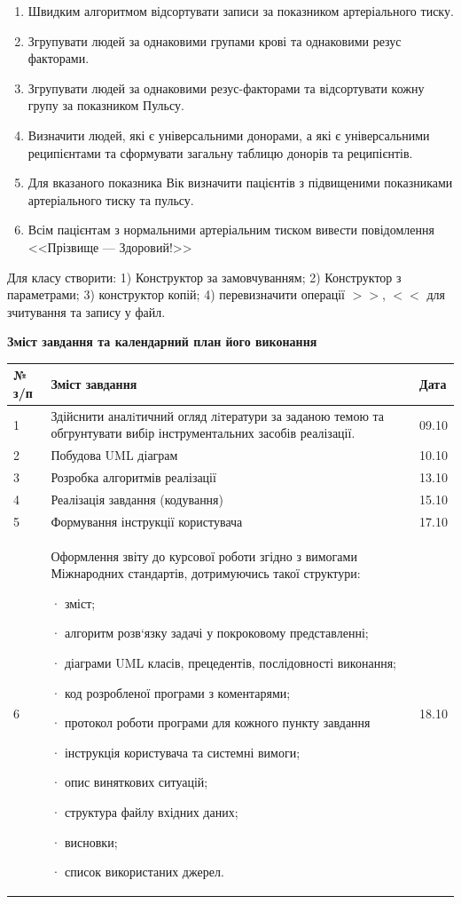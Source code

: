 \documentclass[oneside,14pt]{extarticle}
\begin{document}
\begin{enumerate}
	\item Швидким алгоритмом відсортувати записи за показником артеріального
	тиску.
	\item Згрупувати людей за однаковими групами крові та однаковими резус
	факторами.
	\item Згрупувати людей за однаковими резус-факторами та відсортувати кожну
	групу за показником Пульсу.
	\item Визначити людей, які є універсальними донорами, а які є універсальними
	реципієнтами та сформувати загальну таблицю донорів та реципієнтів.
	\item Для вказаного показника Вік визначити пацієнтів з підвищеними показниками
	артеріального тиску та пульсу.
	\item Всім пацієнтам з нормальними артеріальним тиском вивести повідомлення
	<<Прізвище --- Здоровий!>>
\end{enumerate}
Для класу створити: 1) Конструктор за замовчуванням; 2) Конструктор з
параметрами; 3) конструктор копій; 4) перевизначити операції $>>$, $<<$ для
зчитування та запису у файл.
\newpage
\begin{center}
	\textbf{Зміст завдання та календарний план його виконання}
	
	\begin{tabular}{ | m{0.7cm} | m{14cm}| m{1.1cm} | }
		\hline
		№ з/п & Зміст завдання & Дата \\ 
		\hline
		1 & Здійснити аналiтичний огляд лiтератури за заданою темою та обгрунтувати вибір інструментальних засобів реалізації. & 09.10 \\
		\hline
		2 & Побудова UML діаграм & 10.10 \\
		\hline
		3 & Розробка алгоритмів реалізації & 13.10 \\
		\hline
		4 & Реалізація завдання (кодування) & 15.10 \\
		\hline
		5 & Формування інструкції користувача & 17.10 \\
		\hline
		6 & Оформлення звіту до курсової роботи згідно з вимогами Міжнародних стандартів, дотримуючись такої структури:
		
		·       зміст;
		
		·       алгоритм розв‘язку задачі у покроковому представленні;
		
		·       діаграми UML класів, прецедентів, послідовності виконання;
		
		·       код розробленої програми з коментарями;
		
		·       протокол роботи програми для кожного пункту завдання
		
		·       інструкція користувача та системні вимоги;
		
		·       опис виняткових ситуацій;
		
		·       структура файлу вхідних даних;
		
		·       висновки;
		
		·       список використаних джерел. & 18.10 \\
		\hline
	\end{tabular}
\end{center}
\end{document}
